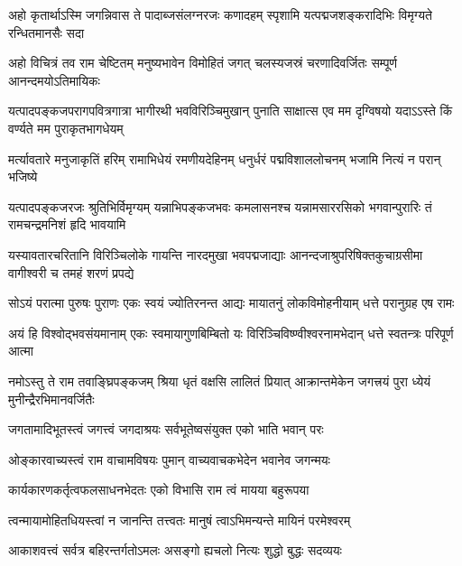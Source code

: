 \addtocounter{shlokacount}{42}

\fourlineindentedshloka
{अहो कृतार्थाऽस्मि जगन्निवास ते}
{पादाब्जसंलग्नरजः कणादहम्}
{स्पृशामि यत्पद्मजशङ्करादिभिः}
{विमृग्यते रन्धितमानसैः सदा}%

\fourlineindentedshloka
{अहो विचित्रं तव राम चेष्टितम्}
{मनुष्यभावेन विमोहितं जगत्}
{चलस्यजस्रं चरणादिवर्जितः}
{सम्पूर्ण आनन्दमयोऽतिमायिकः}%

\fourlineindentedshloka
{यत्पादपङ्कजपरागपवित्रगात्रा}
{भागीरथी भवविरिञ्चिमुखान्  पुनाति}
{साक्षात्स एव मम दृग्विषयो यदाऽऽस्ते}
{किं वर्ण्यते मम पुराकृतभागधेयम्}%

\fourlineindentedshloka
{मर्त्यावतारे मनुजाकृतिं हरिम्}
{रामाभिधेयं रमणीयदेहिनम्}
{धनुर्धरं पद्मविशाललोचनम्}
{भजामि नित्यं न परान्  भजिष्ये}%

\fourlineindentedshloka
{यत्पादपङ्कजरजः श्रुतिभिर्विमृग्यम्}
{यन्नाभिपङ्कजभवः कमलासनश्च}
{यन्नामसाररसिको भगवान्पुरारिः}
{तं  रामचन्द्रमनिशं हृदि भावयामि}%

\fourlineindentedshloka
{यस्यावतारचरितानि विरिञ्चिलोके}
{गायन्ति नारदमुखा भवपद्मजाद्याः}
{आनन्दजाश्रुपरिषिक्तकुचाग्रसीमा}
{वागीश्वरी च तमहं शरणं प्रपद्ये}%

\fourlineindentedshloka
{सोऽयं परात्मा पुरुषः पुराणः}
{एकः स्वयं ज्योतिरनन्त आद्यः}
{मायातनुं लोकविमोहनीयाम्}
{धत्ते परानुग्रह एष रामः}%

\fourlineindentedshloka
{अयं हि विश्वोद्भवसंयमानाम्}
{एकः  स्वमायागुणबिम्बितो यः}
{विरिञ्चिविष्ण्वीश्वरनामभेदान्}
{धत्ते स्वतन्त्रः परिपूर्ण आत्मा}%

\fourlineindentedshloka
{नमोऽस्तु ते राम तवाङ्घ्रिपङ्कजम्}
{श्रिया धृतं वक्षसि लालितं प्रियात्}
{आक्रान्तमेकेन जगत्त्रयं पुरा}
{ध्येयं मुनीन्द्रैरभिमानवर्जितैः}%

\twolineshloka
{जगतामादिभूतस्त्वं जगत्त्वं जगदाश्रयः}
{सर्वभूतेष्वसंयुक्त एको भाति भवान् परः}%

\twolineshloka
{ओङ्कारवाच्यस्त्वं राम वाचामविषयः पुमान्}
{वाच्यवाचकभेदेन भवानेव जगन्मयः}%

\twolineshloka
{कार्यकारणकर्तृत्वफलसाधनभेदतः}
{एको विभासि राम त्वं मायया बहुरूपया}%

\twolineshloka
{त्वन्मायामोहितधियस्त्वां न जानन्ति तत्त्वतः}
{मानुषं त्वाऽभिमन्यन्ते मायिनं परमेश्वरम्}%

\twolineshloka
{आकाशवत्त्वं सर्वत्र बहिरन्तर्गतोऽमलः}
{असङ्गो ह्यचलो नित्यः शुद्धो बुद्धः सदव्ययः}%

